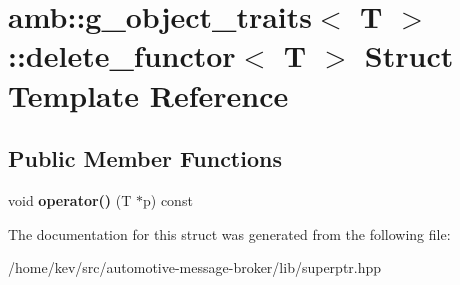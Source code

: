 \hypertarget{structamb_1_1g__object__traits_3_01T_01_4_1_1delete__functor_3_01T_01_4}{\section{amb\+:\+:g\+\_\+object\+\_\+traits$<$ T $>$\+:\+:delete\+\_\+functor$<$ T $>$ Struct Template Reference}
\label{structamb_1_1g__object__traits_3_01T_01_4_1_1delete__functor_3_01T_01_4}
}
\subsection*{Public Member Functions}
\begin{DoxyCompactItemize}
\item 
\hypertarget{structamb_1_1g__object__traits_3_01T_01_4_1_1delete__functor_3_01T_01_4_a27e240659578524ecf7f6f4218ac8d61}{void {\bfseries operator()} (T $\ast$p) const }\label{structamb_1_1g__object__traits_3_01T_01_4_1_1delete__functor_3_01T_01_4_a27e240659578524ecf7f6f4218ac8d61}

\end{DoxyCompactItemize}


The documentation for this struct was generated from the following file\+:\begin{DoxyCompactItemize}
\item 
/home/kev/src/automotive-\/message-\/broker/lib/superptr.\+hpp\end{DoxyCompactItemize}
